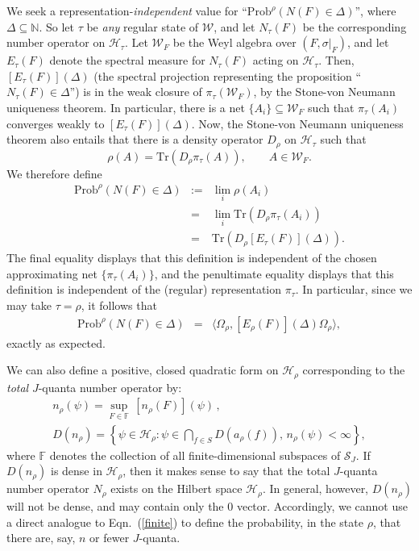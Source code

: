 \documentclass[12pt]{article}
\theoremstyle{remark}
\theoremstyle{definition}
\newcommand{\fin}{\mathbb{F}}
\newcommand{\alg}[1]{\mathcal{#1}}
\newcommand{\hil}[1]{\mathcal{#1}}
\begin{document}
We seek a representation-\emph{independent} value for
 ``$\mathrm{Prob}^{\rho}(N(F)\in \Delta)$'', where $\Delta\subseteq \mathbb{N}$. 
 So let $\tau$ be \emph{any} regular state of $\alg{W}$, and let
$N_{\tau}(F)$ be the corresponding number operator on
$\hil{H}_{\tau}$.  Let $\alg{W}_{F}$ be the Weyl algebra over
$(F,\sigma |_{F})$, and let $E_{\tau }(F)$ denote the spectral measure for
$N_{\tau}(F)$ acting on $\hil{H}_{\tau}$.  Then,
$[E_{\tau}(F)](\Delta )$ (the spectral projection representing the 
proposition ``$N_{\tau}(F)\in \Delta$'') is in the weak closure of $\pi _{\tau}
(\alg{W}_{F})$, by the
Stone-von Neumann uniqueness theorem. In particular, there is a net $\{
A_{i}\} \subseteq \alg{W}_{F}$ such that $\pi _{\tau} (A_{i})$
converges weakly to $[E_{\tau}(F)](\Delta )$.  Now, the Stone-von
Neumann uniqueness theorem also entails that
there is a density operator $D_{\rho}$ on $\hil{H}_{\tau}$ such that
\begin{equation} \rho (A)=\mathrm{Tr}(D_{\rho}\pi _{\tau} (A)) ,\qquad A\in
  \alg{W}_{F} .\end{equation}  
We therefore define
\begin{eqnarray} \mathrm{Prob}^{\rho}(N(F)\in \Delta) &:=& \lim
  _{i}\rho (A_{i}) \label{abstract} \\
&=& \lim _{i}\mathrm{Tr}(D_{\rho}\pi _{\tau} (A_{i})) \\
&=&\mathrm{Tr}(D_{\rho}[E_{\tau}(F)](\Delta )) .\label{finite} \end{eqnarray}
The final equality displays that this definition is independent of the chosen
  approximating net $\{ \pi _{\tau} (A_{i}) \}$, and the penultimate
  equality displays that this definition is independent of the (regular)
  representation $\pi _{\tau}$.   In particular, since we may take
$\tau =\rho$,
  it follows that 
  \begin{eqnarray}
\mathrm{Prob}^{\rho}(N(F)\in \Delta)&=&\langle \Omega
_{\rho},[E_{\rho}(F)](\Delta )\Omega _{\rho}\rangle ,\end{eqnarray}
exactly as expected.

We can also define a positive, closed quadratic form on $\hil{H}_{\rho}$
corresponding to the \emph{total} $J$-quanta number operator by:
\begin{eqnarray}
n_{\rho}(\psi )=\sup _{F\in \fin}\,[n_{\rho}(F)](\psi ) \, ,\qquad \qquad \\
D(n_{\rho})=\left\{ \psi\in\hil{H}_{\rho}:\psi \in \bigcap _{f\in
    S}D(a_{\rho}(f)),\, n_{\rho}(\psi )<\infty \right\}
,\end{eqnarray}
where $\fin$ denotes the collection of all finite-dimensional 
subspaces of $\hil{S}_{J}$.  If $D(n_{\rho})$ is dense in $\hil{H}_{\rho}$, then it makes sense to
say that the total $J$-quanta number operator $N_{\rho}$ exists on the
Hilbert space $\hil{H}_{\rho}$.  In general, however, $D(n_{\rho})$ will not be
dense, and may contain only the $0$ vector.  Accordingly, we cannot use a direct
analogue to Eqn.~(\ref{finite}) to define the probability, in the state
$\rho$, that there are, say, $n$ or fewer $J$-quanta.  
\end{document}
